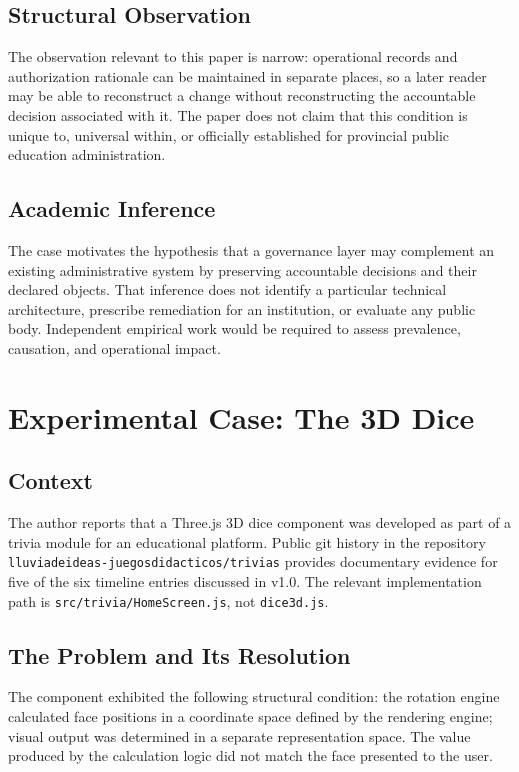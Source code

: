 \documentclass[conference]{IEEEtran}
\begin{document}
\subsection{Structural Observation}

The observation relevant to this paper is narrow: operational records and
authorization rationale can be maintained in separate places, so a later reader
may be able to reconstruct a change without reconstructing the accountable
decision associated with it. The paper does not claim that this condition is
unique to, universal within, or officially established for provincial public
education administration.

\subsection{Academic Inference}

The case motivates the hypothesis that a governance layer may complement an
existing administrative system by preserving accountable decisions and their
declared objects. That inference does not identify a particular technical
architecture, prescribe remediation for an institution, or evaluate any public
body. Independent empirical work would be required to assess prevalence,
causation, and operational impact.

\section{Experimental Case: The 3D Dice}

\subsection{Context}

The author reports that a Three.js 3D dice component was developed as part of a
trivia module for an educational platform. Public git history in the repository
\texttt{lluviadeideas-juegosdidacticos/trivias} provides documentary evidence for
five of the six timeline entries discussed in v1.0. The relevant implementation
path is \texttt{src/trivia/HomeScreen.js}, not \texttt{dice3d.js}.

\subsection{The Problem and Its Resolution}

The component exhibited the following structural condition: the rotation engine calculated face positions in a coordinate space defined by the rendering engine; visual output was determined in a separate representation space. The value produced by the calculation logic did not match the face presented to the user.
\end{document}
